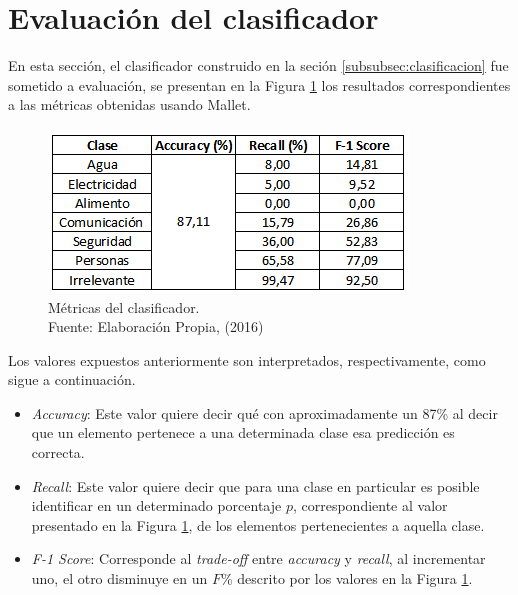 \section{Evaluación del clasificador}
\label{sec:EvalClassificador}

En esta sección, el clasificador construido en la seción \ref{subsubsec:clasificacion} fue sometido a evaluación, se presentan en la Figura \ref{fig:metricasClass} los resultados correspondientes a las métricas obtenidas usando Mallet.

\begin{figure}[H]
        \centering
        \captionsetup{justification=centering}
        \includegraphics[scale=0.8]{images/MetricasClasificador.png}
        \caption[Métricas del clasificador.]{Métricas del clasificador.\\Fuente: Elaboración Propia, (2016)}
        \label{fig:metricasClass}
\end{figure}

Los valores expuestos anteriormente son interpretados, respectivamente, como sigue a continuación.

\begin{itemize}
\item \textit{Accuracy}: Este valor quiere decir qué con aproximadamente un 87\% al decir que un elemento pertenece a una determinada clase esa predicción es correcta.
\item \textit{Recall}: Este valor quiere decir que para una clase en particular es posible identificar en un determinado porcentaje $p$, correspondiente al valor presentado en la Figura \ref{fig:metricasClass}, de los elementos pertenecientes a aquella clase.
\item \textit{F-1 Score}: Corresponde al \textit{trade-off} entre \textit{accuracy} y \textit{recall}, al incrementar uno, el otro disminuye en un $F$\% descrito por los valores en la Figura \ref{fig:metricasClass}.
\end{itemize}

